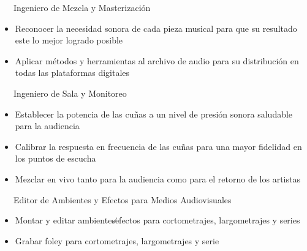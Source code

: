 
{~~~Ingeniero de Mezcla y Masterización} %
{ %
    \begin{itemize}
        \item Reconocer la necesidad sonora de cada pieza musical para que su resultado este lo mejor logrado posible
        \item Aplicar métodos y herramientas al archivo de audio para su distribución en todas las plataformas digitales
    \end{itemize}
}

{~~~Ingeniero de Sala y Monitoreo} %
{ %
    \begin{itemize}
        \item Establecer la potencia de las cuñas a un nivel de presión sonora saludable para la audiencia
        \item Calibrar la respuesta en frecuencia de las cuñas para una mayor fidelidad en los puntos de escucha 
        \item Mezclar en vivo tanto para la audiencia como para el retorno de los artistas
    \end{itemize}
}

{~~~Editor de Ambientes y Efectos para Medios Audiovisuales} %
{ %
    \begin{itemize}
        \item Montar y editar ambientes∕efectos para cortometrajes, largometrajes y series
        \item Grabar foley para cortometrajes, largometrajes y serie
    \end{itemize}
}